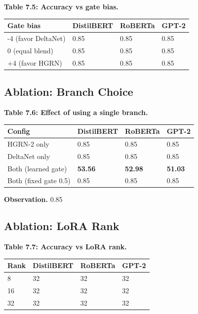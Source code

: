\textbf{Table 7.5: Accuracy vs gate bias.}

\begin{table}[H]
\centering
\small
\begin{tabular}{llll}
\toprule
\textbf{Gate bias} & \textbf{DistilBERT} & \textbf{RoBERTa} & \textbf{GPT-2} \\
\midrule
-4 (favor DeltaNet) & 0.85 & 0.85 & 0.85 \\
0 (equal blend) & 0.85 & 0.85 & 0.85 \\
+4 (favor HGRN) & 0.85 & 0.85 & 0.85 \\
\bottomrule
\end{tabular}
\end{table}

\subsection{Ablation: Branch Choice}

\textbf{Table 7.6: Effect of using a single branch.}

\begin{table}[H]
\centering
\small
\begin{tabular}{llll}
\toprule
\textbf{Config} & \textbf{DistilBERT} & \textbf{RoBERTa} & \textbf{GPT-2} \\
\midrule
HGRN-2 only & 0.85 & 0.85 & 0.85 \\
DeltaNet only & 0.85 & 0.85 & 0.85 \\
Both (learned gate) & \textbf{53.56} & \textbf{52.98} & \textbf{51.03} \\
Both (fixed gate 0.5) & 0.85 & 0.85 & 0.85 \\
\bottomrule
\end{tabular}
\end{table}

\textbf{Observation.} 0.85

\subsection{Ablation: LoRA Rank}

\textbf{Table 7.7: Accuracy vs LoRA rank.}

\begin{table}[H]
\centering
\small
\begin{tabular}{llll}
\toprule
\textbf{Rank} & \textbf{DistilBERT} & \textbf{RoBERTa} & \textbf{GPT-2} \\
\midrule
8 & 32 & 32 & 32 \\
16 & 32 & 32 & 32 \\
32 & 32 & 32 & 32 \\
\bottomrule
\end{tabular}
\end{table}

